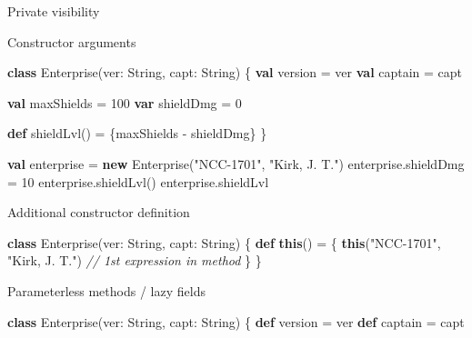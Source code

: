 \documentclass[ignorenonframetext,]{beamer}
\newenvironment{Shaded}{\begin{snugshade}}{\end{snugshade}}
\newcommand{\KeywordTok}[1]{\textcolor[rgb]{0.13,0.29,0.53}{\textbf{#1}}}
\newcommand{\DecValTok}[1]{\textcolor[rgb]{0.00,0.00,0.81}{#1}}
\newcommand{\StringTok}[1]{\textcolor[rgb]{0.31,0.60,0.02}{#1}}
\newcommand{\CommentTok}[1]{\textcolor[rgb]{0.56,0.35,0.01}{\textit{#1}}}
\newcommand{\FunctionTok}[1]{\textcolor[rgb]{0.00,0.00,0.00}{#1}}
\newcommand{\NormalTok}[1]{#1}
\begin{document}
\begin{frame}[fragile]
\begin{block}{Private visibility}
\end{block}

\begin{block}{Constructor arguments}

\begin{Shaded}
\begin{Highlighting}[]
\KeywordTok{class} \FunctionTok{Enterprise}\NormalTok{(ver: String, capt: String) \{}
    \KeywordTok{val}\NormalTok{ version = ver}
    \KeywordTok{val}\NormalTok{ captain = capt}

    \KeywordTok{val}\NormalTok{ maxShields = }\DecValTok{100}
    \KeywordTok{var}\NormalTok{ shieldDmg = }\DecValTok{0}

    \KeywordTok{def} \FunctionTok{shieldLvl}\NormalTok{() = \{maxShields - shieldDmg\}}
\NormalTok{\}}

\KeywordTok{val}\NormalTok{ enterprise = }\KeywordTok{new} \FunctionTok{Enterprise}\NormalTok{(}\StringTok{"NCC-1701"}\NormalTok{, }\StringTok{"Kirk, J. T."}\NormalTok{)}
\NormalTok{enterprise.}\FunctionTok{shieldDmg}\NormalTok{ = }\DecValTok{10}
\NormalTok{enterprise.}\FunctionTok{shieldLvl}\NormalTok{()}
\NormalTok{enterprise.}\FunctionTok{shieldLvl}
\end{Highlighting}
\end{Shaded}

\end{block}

\begin{block}{Additional constructor definition}

\begin{Shaded}
\begin{Highlighting}[]
\KeywordTok{class} \FunctionTok{Enterprise}\NormalTok{(ver: String, capt: String) \{}
    \KeywordTok{def} \KeywordTok{this}\NormalTok{() = \{}
        \KeywordTok{this}\NormalTok{(}\StringTok{"NCC-1701"}\NormalTok{, }\StringTok{"Kirk, J. T."}\NormalTok{)   }\CommentTok{// 1st expression in method}
\NormalTok{    \}}
\NormalTok{\}}
\end{Highlighting}
\end{Shaded}

\end{block}

\begin{block}{Parameterless methods / lazy fields}

\begin{Shaded}
\begin{Highlighting}[]
\KeywordTok{class} \FunctionTok{Enterprise}\NormalTok{(ver: String, capt: String) \{}
    \KeywordTok{def}\NormalTok{ version = ver}
    \KeywordTok{def}\NormalTok{ captain = capt}


\end{Highlighting}
\end{Shaded}
\end{block}
\end{frame}
\end{document}
